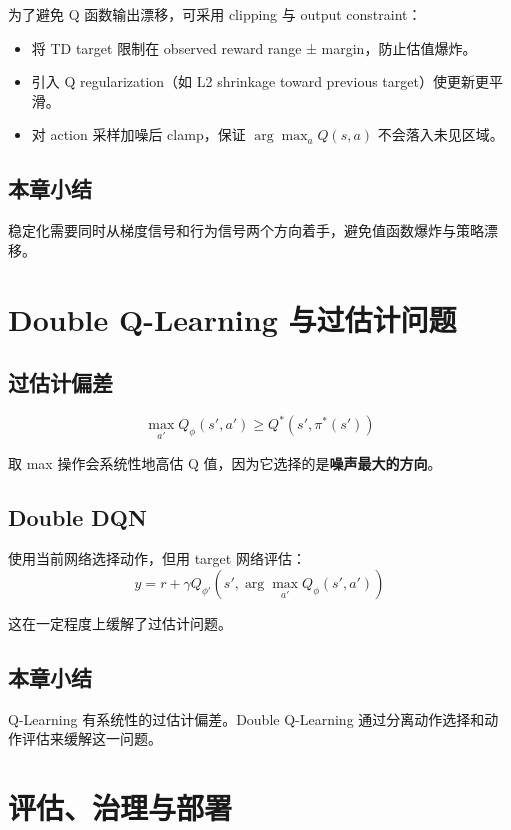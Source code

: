 \documentclass[a4paper]{article}
\begin{document}
为了避免 Q 函数输出漂移，可采用 clipping 与 output constraint：

\begin{itemize}
    \item 将 TD target 限制在 observed reward range ± margin，防止估值爆炸。
    \item 引入 Q regularization（如 L2 shrinkage toward previous target）使更新更平滑。
    \item 对 action 采样加噪后 clamp，保证 $\arg\max_a Q(s,a)$ 不会落入未见区域。
\end{itemize}

\subsection{本章小结}

稳定化需要同时从梯度信号和行为信号两个方向着手，避免值函数爆炸与策略漂移。

\section{Double Q-Learning 与过估计问题}

\subsection{过估计偏差}

$$\max_{a'} Q_\phi(s', a') \geq Q^*(s', \pi^*(s'))$$

取 max 操作会系统性地高估 Q 值，因为它选择的是\textbf{噪声最大的方向}。

\subsection{Double DQN}

使用当前网络选择动作，但用 target 网络评估：
$$y = r + \gamma Q_{\phi'}\left(s', \arg\max_{a'} Q_\phi(s', a')\right)$$

这在一定程度上缓解了过估计问题。

\subsection{本章小结}

Q-Learning 有系统性的过估计偏差。Double Q-Learning 通过分离动作选择和动作评估来缓解这一问题。

\section{评估、治理与部署}
\end{document}
